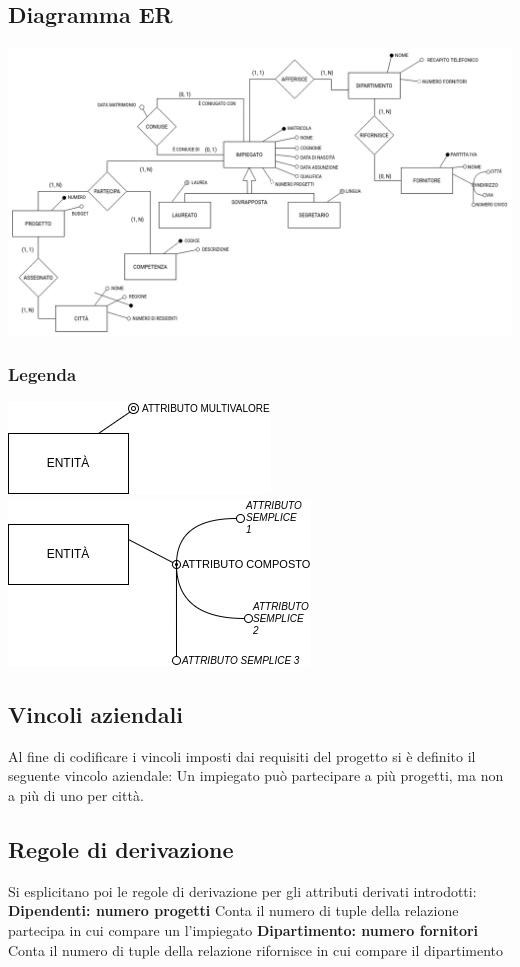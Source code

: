 \documentclass{article}
\begin{document}
\subsection{Diagramma ER}
\includegraphics[width=\textwidth]{er.png}

\subsubsection*{Legenda}
\includegraphics[width=.2\textwidth]{multivalore.png}
\newline
\includegraphics[width=.2\textwidth]{composto.png}

\newpage

\subsection{Vincoli aziendali}
Al fine di codificare i vincoli imposti dai requisiti del progetto si è definito il seguente vincolo aziendale:
\newline
\newline
Un impiegato può partecipare a più progetti, ma non a più di uno per città.

\subsection{Regole di derivazione}
Si esplicitano poi le regole di derivazione per gli attributi derivati introdotti:
\newline
\newline
\textbf{Dipendenti: numero progetti}
\newline
Conta il numero di tuple della relazione partecipa in cui compare un l'impiegato
\newline
\newline
\textbf{Dipartimento: numero fornitori}
\newline
Conta il numero di tuple della relazione rifornisce in cui compare il dipartimento
\end{document}
